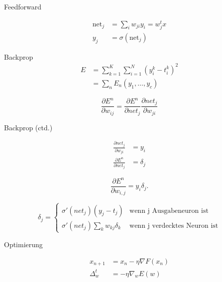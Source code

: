 \documentclass[10pt, compress, xetex]{beamer}
\begin{document}
\begin{frame}{Feedforward}
\begin{figure}[ht!]
  \centering
\end{figure}

\begin{align}
	\text{net}_j & = \sum_{i} w_{ji} y_i = w_j^t x \\
	y_j & = \sigma (\text{net}_j)
\end{align} 
\end{frame}

\begin{frame}{Backprop}
\begin{align}
	E &= \sum_{k=1}^K \sum_{i=1}^N \left( y_i^k - t_i^k \right)^2 \\
	  &=  \sum_n E_n(y_1, \ldots, y_c)
\end{align}

\begin{equation}
\frac{\partial E^n}{\partial w_{ij}} = \frac{\partial E^n}{\partial net_j}  \frac{\partial net_j }{\partial w_{ji}}
\end{equation}

\end{frame}

\begin{frame}{Backprop (ctd.)}


\begin{align}
  \frac{\partial net_j }{\partial w_{ji}} & =  y_i
  \\
  \frac{\partial E^n}{\partial net_j} & =  \delta_j
\end{align}

\begin{equation}
\label{eq:evaluate}
  \frac{\partial E^n}{\partial w_{i,j}} = y_i  \delta_j.
\end{equation}

\begin{equation}
\label{eq:backpropagation}
\delta_j =  \begin{cases}
               \sigma ' (net_j) (y_j - t_j)           & \text{wenn j Ausgabeneuron ist}\\
               \sigma ' (net_j) \sum_k w_{kj} \delta_k     & \text{wenn j verdecktes Neuron ist}
           \end{cases} 
\end{equation} 
\end{frame}
\begin{frame}{Optimierung}

\begin{align}
x_{n+1} &=x_n- \eta  \nabla F(x_n) \\
\Delta_w^t &= - \eta  \nabla_w E(w)
\end{align}

\end{frame}
\end{document}
